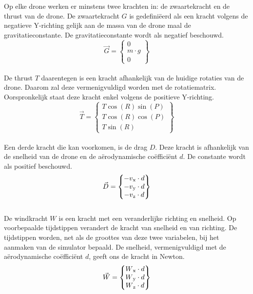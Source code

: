 \\
\\
Op elke drone werken er minstens twee krachten in: de zwaartekracht en de thrust van de drone. De zwaartekracht \(G\) is gedefiniëerd als een kracht volgens de negatieve Y-richting gelijk aan de massa van de drone maal de gravitatieconstante. De gravitatieconstante wordt als negatief beschouwd.
\begin{equation*}
\vec{G} = 
\begin{Bmatrix}
0 \\
m \cdot g \\
0
\end{Bmatrix} \label{zwaartekracht}
\end{equation*}
\\
De thrust \(T\) daarentegen is een kracht afhankelijk van de huidige rotaties van de drone. Daarom zal deze vermenigvuldigd worden met de rotatiematrix. Oorspronkelijk staat deze kracht enkel volgens de positieve Y-richting. 
\\
\begin{equation*}
\vec{T} =
\begin{Bmatrix}
T \cos(R) \sin(P) \\
T \cos(R)\cos(P)\\
T \sin(R)
\end{Bmatrix} \label{thrustkracht}
\end{equation*}
\\
Een derde kracht die kan voorkomen, is de drag \(D\). Deze kracht is afhankelijk van de snelheid van de drone en de a\"erodynamische coëfficiënt \(d\). De constante wordt als positief beschouwd.
\begin{equation*}
\vec{D} =
\begin{Bmatrix}
-v\textsubscript{x} \cdot d \\
-v\textsubscript{y} \cdot d \\
-v\textsubscript{z} \cdot d 
\end{Bmatrix} \label{dragkracht}
\end{equation*}
\\
De windkracht \(W\) is een kracht met een veranderlijke richting en snelheid. Op voorbepaalde tijdstippen verandert de kracht van snelheid en van richting. De tijdstippen worden, net als de groottes van deze twee variabelen, bij het aanmaken van de simulator bepaald. De snelheid, vermenigvuldigd met de a\"erodynamische coëfficiënt \(d\), geeft ons de kracht in Newton. 
\begin{equation*}
\vec{W} = 
\begin{Bmatrix}
W\textsubscript{x} \cdot d \\
W\textsubscript{y} \cdot d \\
W\textsubscript{z} \cdot d 
\end{Bmatrix} \label{windkracht}
\end{equation*}
